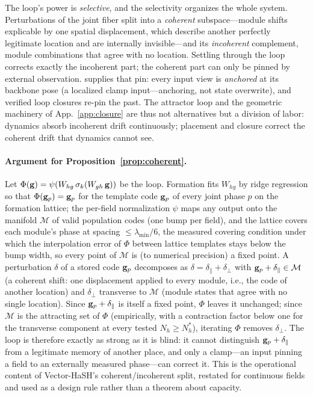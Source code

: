 The loop's power is \emph{selective}, and the selectivity organizes the
whole system. Perturbations of the joint fiber split into a
\emph{coherent} subspace---module shifts explicable by one spatial
displacement, which describe another perfectly legitimate location and are
internally invisible---and its \emph{incoherent} complement, module
combinations that agree with no location. Settling through the loop
corrects exactly the incoherent part; the coherent part can only be pinned
by external observation. \smr{} supplies that pin: every input view is
\emph{anchored} at its backbone pose (a localized clamp input---anchoring,
not state overwrite), and verified loop closures re-pin the past. The
attractor loop and the geometric machinery of App.~\ref{app:closure} are
thus not alternatives but a division of labor: dynamics absorb incoherent
drift continuously; placement and closure correct the coherent drift that
dynamics cannot see.

\paragraph{Argument for Proposition~\ref{prop:coherent}.}
Let $\Phi(\mathbf{g})=\psi(W_{hg}\,\sigma_k(W_{gh}\,\mathbf{g}))$ be the loop. Formation
fits $W_{hg}$ by ridge regression so that $\Phi(\mathbf{g}_p)=\mathbf{g}_p$ for the
template code $\mathbf{g}_p$ of every joint phase $p$ on the formation lattice; the
per-field normalization $\psi$ maps any output onto the manifold $\mathcal M$
of valid population codes (one bump per field), and the lattice covers each
module's phase at spacing $\le\lambda_{\min}/6$, the measured covering
condition under which the interpolation error of $\Phi$ between lattice
templates stays below the bump width, so every point of $\mathcal M$ is (to
numerical precision) a fixed point. A perturbation $\delta$ of a stored code
$\mathbf{g}_p$ decomposes as $\delta=\delta_{\parallel}+\delta_{\perp}$ with
$\mathbf{g}_p+\delta_{\parallel}\in\mathcal M$ (a coherent shift: one displacement
applied to every module, i.e., the code of another location) and
$\delta_{\perp}$ transverse to $\mathcal M$ (module states that agree with no
single location). Since $\mathbf{g}_p+\delta_{\parallel}$ is itself a fixed point,
$\Phi$ leaves it unchanged; since $\mathcal M$ is the attracting set of $\Phi$
(empirically, with a contraction factor below one for the transverse component
at every tested $N_h\ge N_h^{*}$), iterating $\Phi$ removes $\delta_{\perp}$.
The loop is therefore exactly as strong as it is blind: it cannot distinguish
$\mathbf{g}_p+\delta_{\parallel}$ from a legitimate memory of another place, and
only a clamp---an input pinning a field to an externally measured phase---can
correct it. This is the operational content of Vector-HaSH's
coherent/incoherent split, restated for continuous fields and used as a design
rule rather than a theorem about capacity.

